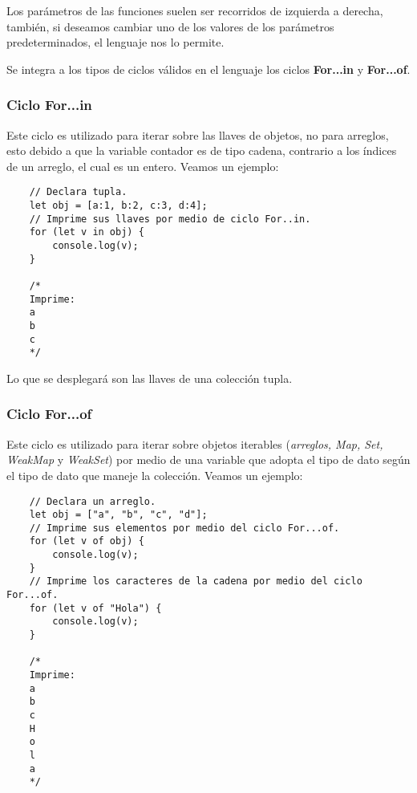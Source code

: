 Los parámetros de las funciones suelen ser recorridos de izquierda a derecha, también, si deseamos cambiar uno de los valores de los parámetros predeterminados, el lenguaje nos lo permite.

Se integra a los tipos de ciclos válidos en el lenguaje los ciclos \textbf{For...in} y \textbf{For...of}.


\subsubsection{Ciclo For...in}
\hspace{0.55cm}Este ciclo es utilizado para iterar sobre las llaves de objetos, no para arreglos, esto debido a que la variable contador es de tipo cadena, contrario a los índices de un arreglo, el cual es un entero. Veamos un ejemplo:
\begin{lstlisting}
    // Declara tupla.
    let obj = [a:1, b:2, c:3, d:4];
    // Imprime sus llaves por medio de ciclo For..in.
    for (let v in obj) {
        console.log(v);
    }

    /*
    Imprime:
    a
    b
    c
    */
\end{lstlisting}

Lo que se desplegará son las llaves de una colección tupla.

\subsubsection{Ciclo For...of}
\hspace{0.55cm}Este ciclo es utilizado para iterar sobre objetos iterables (\textit{arreglos, Map, Set, WeakMap} y \textit{WeakSet}) por medio de una variable que adopta el tipo de dato según el tipo de dato que maneje la colección. Veamos un ejemplo:
\begin{lstlisting}
    // Declara un arreglo.
    let obj = ["a", "b", "c", "d"];
    // Imprime sus elementos por medio del ciclo For...of.
    for (let v of obj) {
        console.log(v);
    }
    // Imprime los caracteres de la cadena por medio del ciclo For...of.
    for (let v of "Hola") {
        console.log(v);
    }

    /*
    Imprime:
    a
    b
    c
    H
    o
    l
    a
    */
\end{lstlisting}



